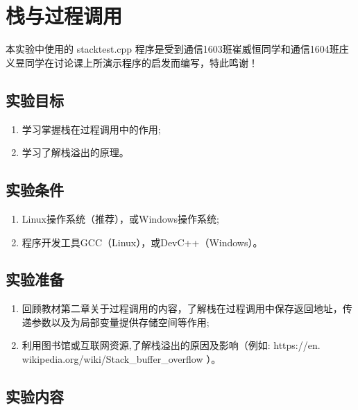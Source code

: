 
\chapter{栈与过程调用}

本实验中使用的 stacktest.cpp 程序是受到通信1603班崔威恒同学和通信1604班庄义昱同学在讨论课上所演示程序的启发而编写，特此鸣谢！

\section{实验目标}

\begin{enumerate}
	\item 学习掌握栈在过程调用中的作用;
	\item 学习了解栈溢出的原理。
\end{enumerate}

\section{实验条件}

\begin{enumerate}
	\item Linux操作系统（推荐），或Windows操作系统;
	\item 程序开发工具GCC（Linux），或DevC++（Windows）。
\end{enumerate}

\section{实验准备}

\begin{enumerate}
	\item 回顾教材第二章关于过程调用的内容，了解栈在过程调用中保存返回地址，传递参数以及为局部变量提供存储空间等作用;
	\item 利用图书馆或互联网资源,了解栈溢出的原因及影响（例如: https://en.
		wikipedia.org/wiki/Stack\_buffer\_overflow ）。
\end{enumerate}

\section{实验内容}

